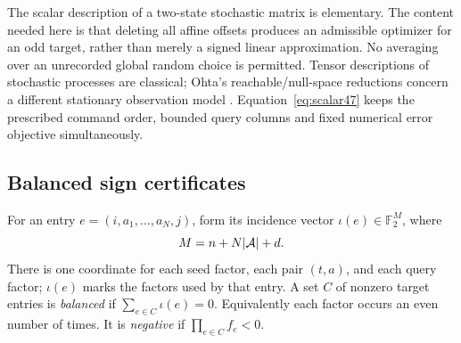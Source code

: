 The scalar description of a two-state stochastic matrix is elementary.
The content needed here is that deleting all affine offsets produces
an admissible optimizer for an odd target, rather than merely a signed
linear approximation. No averaging over an unrecorded global random
choice is permitted. Tensor descriptions of stochastic processes are
classical; Ohta's reachable/null-space reductions concern a different
stationary observation model \cite{Ohta20}. Equation~\eqref{eq:scalar47}
keeps the prescribed command order, bounded query columns and fixed
numerical error objective simultaneously.

\subsection{Balanced sign certificates}
For an entry $e=(i,a_1,\ldots,a_N,j)$, form its incidence vector
$\iota(e)\in\mathbb F_2^M$, where
\[
 M=n+N|\mathcal A|+d.
\]
There is one coordinate for each seed factor, each pair $(t,a)$, and
each query factor; $\iota(e)$ marks the factors used by that entry.
A set $C$ of nonzero target entries is \emph{balanced} if
$\sum_{e\in C}\iota(e)=0$. Equivalently each factor occurs an even
number of times. It is \emph{negative} if $\prod_{e\in C}f_e<0$.


